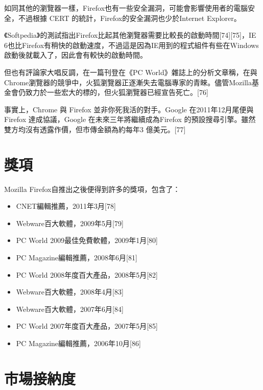 \documentclass[12pt, a4paper]{article}
\begin{document}
如同其他的瀏覽器一樣，Firefox也有一些安全漏洞，可能會影響使用者的電腦安全，不過根據 CERT 的統計，Firefox的安全漏洞也少於Internet Explorer。

《Softpedia》的測試指出Firefox比起其他瀏覽器需要比較長的啟動時間[74][75]，IE 6也比Firefox有稍快的啟動速度，不過這是因為IE用到的程式組件有些在Windows啟動後就載入了，因此會有較快的啟動時間。

但也有評論家大唱反調，在一篇刊登在《PC World》雜誌上的分析文章稱，在與Chrome瀏覽器的競爭中，火狐瀏覽器正逐漸失去電腦專家的青睞。儘管Mozilla基金會仍致力於一些宏大的標的，但火狐瀏覽器已經宣告死亡。[76]

事實上，Chrome 與 Firefox 並非你死我活的對手。Google 在2011年12月尾便與Firefox 達成協議，Google 在未來三年將繼續成為Firefox 的預設搜尋引擎。雖然雙方均沒有透露作價，但市傳金額為約每年3 億美元。[77]

\section{獎項}

Mozilla Firefox自推出之後便得到許多的獎項，包含了：

\begin{itemize}
\item CNET編輯推薦，2011年3月[78]
\item Webware百大軟體，2009年5月[79]
\item PC World 2009最佳免費軟體，2009年1月[80]
\item PC Magazine編輯推薦，2008年6月[81]
\item PC World 2008年度百大產品，2008年5月[82]
\item Webware百大軟體，2008年4月[83]
\item Webware百大軟體，2007年6月[84]
\item PC World 2007年度百大產品，2007年5月[85]
\item PC Magazine編輯推薦，2006年10月[86]
\end{itemize}

\section{市場接納度}
\end{document}
